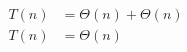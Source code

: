 \begin{subequations}
\label{eq:findlinesegments-all}
\begin{align}
\label{eq:findlinesegments10}
T(n)& = \Theta(n) + \Theta(n)\\
\label{eq:findlinesegments11}
T(n)& = \Theta(n)
\end{align}
\end{subequations}
